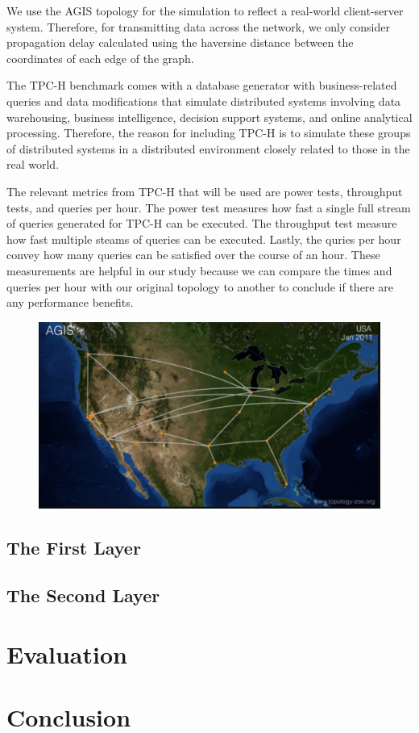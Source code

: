 \indent We use the AGIS topology for the simulation to reflect a real-world client-server system. Therefore, for transmitting data across the network, we only consider propagation delay calculated using the haversine distance between the coordinates of each edge of the graph.

\indent The TPC-H benchmark comes with a database generator with business-related queries and data modifications that simulate distributed systems involving data warehousing, business intelligence, decision support systems, and online analytical processing. Therefore, the reason for including TPC-H is to simulate these groups of distributed systems in a distributed environment closely related to those in the real world.

\indent The relevant metrics from TPC-H that will be used are power tests, throughput tests, and queries per hour. The power test measures how fast a single full stream of queries generated for TPC-H can be executed. The throughput test measure how fast multiple steams of queries can be executed. Lastly, the quries per hour convey how many queries can be satisfied over the course of an hour. These measurements are helpful in our study because we can compare the times and queries per hour with our original topology to another to conclude if there are any performance benefits.

\begin{figure}[tp]
\centering
\includegraphics[width=0.5 \textwidth]{figures/AGIS_ORIG}
\caption{\blindtext}
\end{figure}

\subsection{The First Layer}

\subsection{The Second Layer}

\section{Evaluation}

\section{Conclusion}

